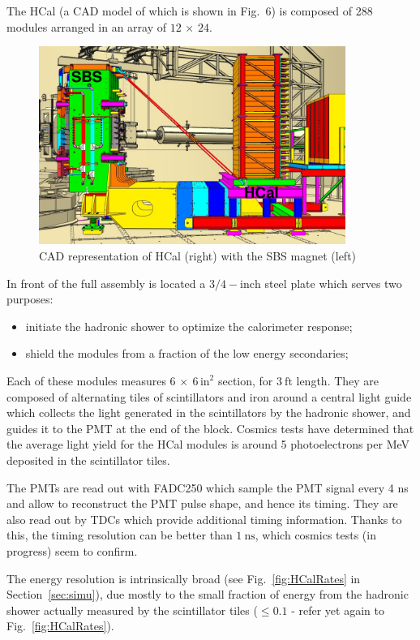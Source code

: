 The HCal (a CAD model of which is shown in Fig.~6)%
is composed of 288 modules arranged in an array of $12\, \times \, 24$.
%
\begin{figure}[!h]
  \centering
    \includegraphics[width=10cm]{Plots/Wines_SBS_CAD_Fall2018.png}
    \caption{CAD representation of HCal (right) with the SBS magnet (left)}
    \label{fig:hcal_cad}
\end{figure}
%
In front of the full assembly is located a $3/4-\mathrm{inch}$ steel plate which serves two purposes:
%
\begin{itemize}
\item{initiate the hadronic shower to optimize the calorimeter response;}
\item{shield the modules from a fraction of the low energy secondaries;}
\end{itemize}
%
Each of these modules measures $6\,\times~6\,\mathrm{in}^2$ section, for $3~\mathrm{ft}$ length. They are composed of alternating tiles of scintillators and iron around a central light guide which collects the light generated in the scintillators by the hadronic shower, and guides it to the PMT at the end of the block.
Cosmics tests have determined that the average light yield for the HCal modules is around 5 photoelectrons per MeV deposited in the scintillator tiles.

The PMTs are read out with FADC250 which sample the PMT signal every 4 ns and allow to reconstruct the PMT pulse shape, and hence its timing.
They are also read out by TDCs which provide additional timing information.
Thanks to this, the timing resolution can be better than $1~\mathrm{ns}$, which cosmics tests (in progress) seem to confirm.

The energy resolution is intrinsically broad (see Fig.~\ref{fig:HCalRates} in Section~\ref{sec:simu}), due mostly to the small fraction of energy from the hadronic shower actually measured by the scintillator tiles ($\leq 0.1$ - refer yet again to Fig.~\ref{fig:HCalRates}).

